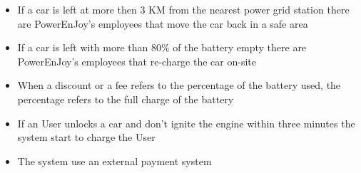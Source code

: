 \begin{itemize}
	\item{If a car is left at more then 3 KM from the nearest power grid station there are PowerEnJoy's employees that move the car back in a \gls{safe area}}
	\item{If a car is left with more than 80\% of the battery empty there are PowerEnJoy's employees that re­‐charge the car on-­site}
	\item{When a discount or a fee refers to the percentage of the battery used, the percentage refers to the full charge of the battery}
	\item{If an User unlocks a car and don't ignite the engine within three minutes the system start to charge the User}%
	\item{The system use an external payment system}
	
\end{itemize}
